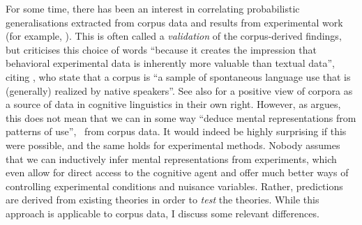 For some time, there has been an interest in correlating probabilistic generalisations extracted from corpus data and results from experimental work (for example, \citealp{ArppeJaervikivi2007,BresnanEa2007,BresnanFord2010,DivjakGries2008,DivjakEa2016,FordBresnan2013}).
This is often called a \textit{validation} of the corpus-derived findings, but \citet[303]{Divjak2016a} criticises this choice of words ``because it creates the impression that behavioral experimental data is inherently more valuable than textual data'', citing \cite{TummersEa2005}, who state that a corpus is ``a sample of spontaneous language use that is (generally) realized by native speakers''.
See also \citet{Newman2011} for a positive view of corpora as a source of data in cognitive linguistics in their own right.
However, as \citet[486--487]{Dabrowska2016} argues, this does not mean that we can in some way ``deduce mental representations from patterns of use'', \ie\ from corpus data.
It would indeed be highly surprising if this were possible, and the same holds for experimental methods.
Nobody assumes that we can inductively infer mental representations from experiments, which even allow for direct access to the cognitive agent and offer much better ways of controlling experimental conditions and nuisance variables.
Rather, predictions are derived from existing theories in order to \textit{test} the theories.
While this approach is applicable to corpus data, I discuss some relevant differences.


